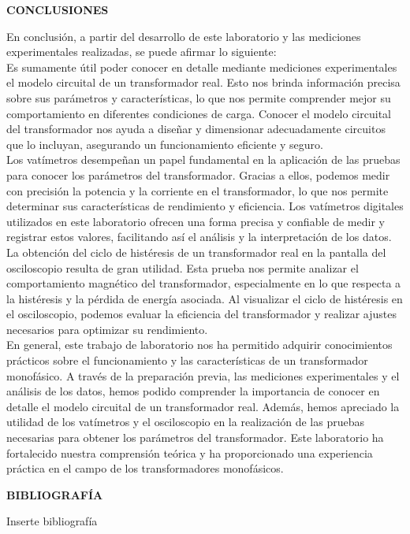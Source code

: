 \documentclass[12pt]{article}
\begin{document}
	
	\newpage
	
	\begin{center}
		\textbf{\large CONCLUSIONES}\\
	\end{center}
	
	En conclusión, a partir del desarrollo de este laboratorio y las mediciones experimentales realizadas, se puede afirmar lo siguiente: \\
	
	Es sumamente útil poder conocer en detalle mediante mediciones experimentales el modelo circuital de un transformador real. Esto nos brinda información precisa sobre sus parámetros y características, lo que nos permite comprender mejor su comportamiento en diferentes condiciones de carga. Conocer el modelo circuital del transformador nos ayuda a diseñar y dimensionar adecuadamente circuitos que lo incluyan, asegurando un funcionamiento eficiente y seguro.\\
	
	Los vatímetros desempeñan un papel fundamental en la aplicación de las pruebas para conocer los parámetros del transformador. Gracias a ellos, podemos medir con precisión la potencia y la corriente en el transformador, lo que nos permite determinar sus características de rendimiento y eficiencia. Los vatímetros digitales utilizados en este laboratorio ofrecen una forma precisa y confiable de medir y registrar estos valores, facilitando así el análisis y la interpretación de los datos.\\
	
	La obtención del ciclo de histéresis de un transformador real en la pantalla del osciloscopio resulta de gran utilidad. Esta prueba nos permite analizar el comportamiento magnético del transformador, especialmente en lo que respecta a la histéresis y la pérdida de energía asociada. Al visualizar el ciclo de histéresis en el osciloscopio, podemos evaluar la eficiencia del transformador y realizar ajustes necesarios para optimizar su rendimiento.\\
	
	En general, este trabajo de laboratorio nos ha permitido adquirir conocimientos prácticos sobre el funcionamiento y las características de un transformador monofásico. A través de la preparación previa, las mediciones experimentales y el análisis de los datos, hemos podido comprender la importancia de conocer en detalle el modelo circuital de un transformador real. Además, hemos apreciado la utilidad de los vatímetros y el osciloscopio en la realización de las pruebas necesarias para obtener los parámetros del transformador. Este laboratorio ha fortalecido nuestra comprensión teórica y ha proporcionado una experiencia práctica en el campo de los transformadores monofásicos.\\
	
	\newpage
	
	\begin{center}
		\textbf{\large BIBLIOGRAFÍA}\\
	\end{center}
	
	Inserte bibliografía
	
	\newpage
	
\end{document}
